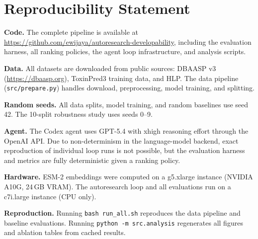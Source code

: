 \section{Reproducibility Statement}
\label{sec:reproducibility}

\textbf{Code.}
The complete pipeline is available at \url{https://github.com/ewijaya/autoresearch-developability}, including the evaluation harness, all ranking policies, the agent loop infrastructure, and analysis scripts.

\textbf{Data.}
All datasets are downloaded from public sources: DBAASP v3 (\url{https://dbaasp.org}), ToxinPred3 training data, and HLP.
The data pipeline (\texttt{src/prepare.py}) handles download, preprocessing, model training, and splitting.

\textbf{Random seeds.}
All data splits, model training, and random baselines use seed 42.
The 10-split robustness study uses seeds 0--9.

\textbf{Agent.}
The Codex agent uses GPT-5.4 with xhigh reasoning effort through the OpenAI API.
Due to non-determinism in the language-model backend, exact reproduction of individual loop runs is not possible, but the evaluation harness and metrics are fully deterministic given a ranking policy.

\textbf{Hardware.}
ESM-2 embeddings were computed on a g5.xlarge instance (NVIDIA A10G, 24\,GB VRAM).
The autoresearch loop and all evaluations run on a c7i.large instance (CPU only).

\textbf{Reproduction.}
Running \texttt{bash run\_all.sh} reproduces the data pipeline and baseline evaluations.
Running \texttt{python -m src.analysis} regenerates all figures and ablation tables from cached results.
